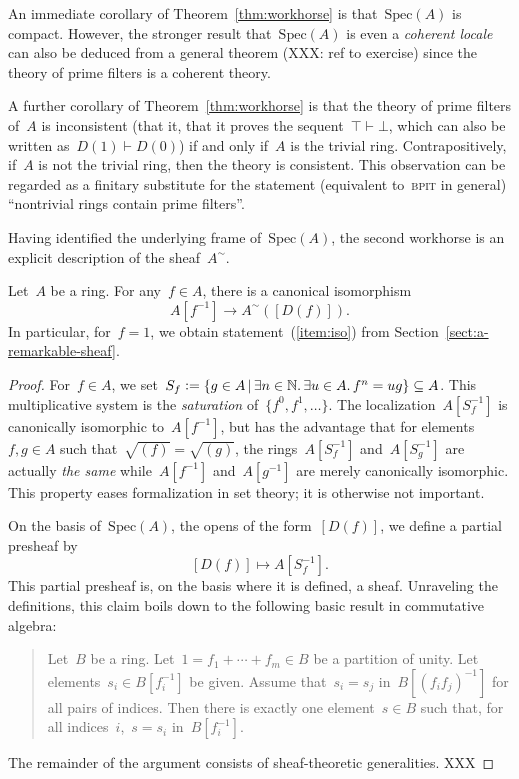 \documentclass{ws-rv9x6}
\newcommand{\NN}{\mathbb{N}}
\newcommand{\defeq}{\vcentcolon=}
\newcommand{\Spec}{\mathrm{Spec}}
\renewcommand{\_}{\mathpunct{.}}
\newcommand{\?}{\,{:}\,}
\newcommand{\BPIT}{\textsc{bpit}\xspace}
\begin{document}
\begin{remark}An immediate corollary of Theorem~\ref{thm:workhorse} is
that~$\Spec(A)$ is compact. However, the stronger result that~$\Spec(A)$ is
even a \emph{coherent locale} can also be deduced from a general theorem (XXX: ref to
exercise) since the theory of prime filters is a coherent theory.\end{remark}

\begin{remark}\label{rem:consistency}
A further corollary of Theorem~\ref{thm:workhorse} is that the theory of prime
filters of~$A$ is inconsistent (that it, that it proves the sequent~$\top
\vdash \bot$, which can also be written as~$D(1) \vdash D(0)$) if and only
if~$A$ is the trivial ring. Contrapositively, if~$A$ is not the trivial ring,
then the theory is consistent. This observation can be regarded as a finitary
substitute for the statement (equivalent to~\BPIT in general) ``nontrivial rings contain prime filters''.
\end{remark}

Having identified the underlying frame of~$\Spec(A)$, the second workhorse is
an explicit description of the sheaf~$A^\sim$.

\begin{proposition}\label{prop:identification}
Let~$A$ be a ring. For any~$f \in A$, there is a canonical isomorphism
\[ A[f^{-1}] \longrightarrow A^\sim([D(f)]). \]
In particular, for~$f = 1$, we obtain statement~(\ref{item:iso}) from
Section~\ref{sect:a-remarkable-sheaf}.
\end{proposition}

\begin{proof}For~$f \in A$, we set~$S_f \defeq \{ g \in A \,|\, \exists n \in
\NN\_ \exists u \in A\_ f^n = ug \} \subseteq A$. This multiplicative system is
the \emph{saturation} of~$\{ f^0, f^1, \ldots \}$. The localization~$A[S_f^{-1}]$
is canonically isomorphic to~$A[f^{-1}]$, but has the advantage that for
elements~$f,g \in A$ such that~$\sqrt{(f)} = \sqrt{(g)}$, the
rings~$A[S_f^{-1}]$ and~$A[S_g^{-1}]$ are actually \emph{the same}
while~$A[f^{-1}]$ and~$A[g^{-1}]$ are merely canonically isomorphic. This
property eases formalization in set theory; it is otherwise not important.

On the basis of~$\Spec(A)$, the opens of the form~$[D(f)]$, we define a partial
presheaf by
\[ [D(f)] \longmapsto A[S_f^{-1}]. \]
This partial presheaf is, on the basis where it is defined, a sheaf. Unraveling
the definitions, this claim boils down to the following basic result in
commutative algebra:
\begin{quote}
Let~$B$ be a ring. Let~$1 = f_1 + \cdots + f_m \in B$ be a partition of unity. Let
elements~$s_i \in B[f_i^{-1}]$ be given. Assume that~$s_i = s_j$
in~$B[(f_if_j)^{-1}]$ for all pairs of indices. Then there is exactly one
element~$s \in B$ such that, for all indices~$i$,~$s = s_i$ in~$B[f_i^{-1}]$.
\end{quote}
The remainder of the argument consists of sheaf-theoretic generalities.
XXX
\end{proof}
\end{document}
